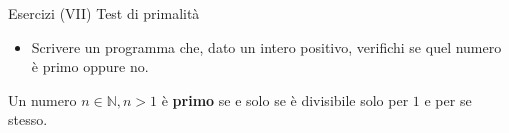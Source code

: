 \begin{frame}{Esercizi (VII)}
  Test di primalità
  \begin{itemize}
    \item Scrivere un programma che, dato un intero positivo, verifichi se quel numero è primo oppure no.
  \end{itemize}

   Un numero $n \in \mathbb{N}, n > 1$ \`e \textbf{primo} se e solo se \`e divisibile solo per $1$ e per
   se stesso.
\end{frame}